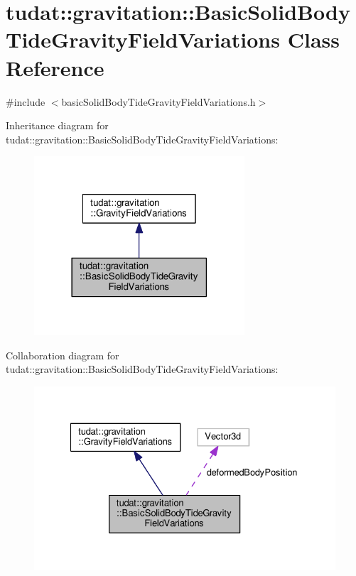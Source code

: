 \hypertarget{classtudat_1_1gravitation_1_1BasicSolidBodyTideGravityFieldVariations}{}\section{tudat\+:\+:gravitation\+:\+:Basic\+Solid\+Body\+Tide\+Gravity\+Field\+Variations Class Reference}
\label{classtudat_1_1gravitation_1_1BasicSolidBodyTideGravityFieldVariations}


{\ttfamily \#include $<$basic\+Solid\+Body\+Tide\+Gravity\+Field\+Variations.\+h$>$}



Inheritance diagram for tudat\+:\+:gravitation\+:\+:Basic\+Solid\+Body\+Tide\+Gravity\+Field\+Variations\+:
\nopagebreak
\begin{figure}[H]
\begin{center}
\leavevmode
\includegraphics[width=222pt]{classtudat_1_1gravitation_1_1BasicSolidBodyTideGravityFieldVariations__inherit__graph}
\end{center}
\end{figure}


Collaboration diagram for tudat\+:\+:gravitation\+:\+:Basic\+Solid\+Body\+Tide\+Gravity\+Field\+Variations\+:
\nopagebreak
\begin{figure}[H]
\begin{center}
\leavevmode
\includegraphics[width=327pt]{classtudat_1_1gravitation_1_1BasicSolidBodyTideGravityFieldVariations__coll__graph}
\end{center}
\end{figure}
